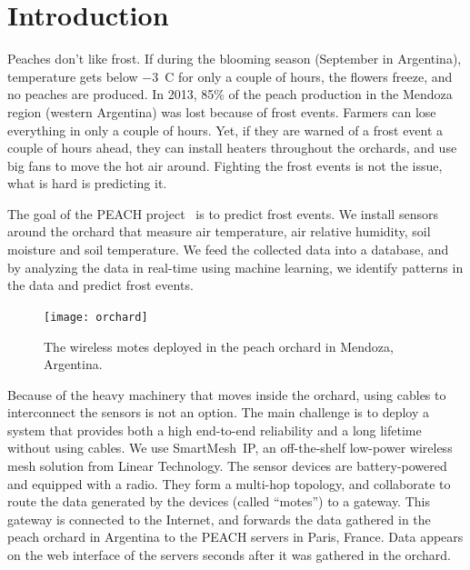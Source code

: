 \documentclass{sig-alternate}
\newcommand{\smip}                {SmartMesh~IP\xspace}
\begin{document}
\section{Introduction}
\label{sec:intro}


Peaches don't like frost.
If during the blooming season (September in Argentina), temperature gets below $-$3~C for only a couple of hours, the flowers freeze, and no peaches are produced.
In 2013, 85\% of the peach production in the Mendoza region (western Argentina) was lost because of frost events.
Farmers can lose everything in only a couple of hours.
Yet, if they are warned of a frost event a couple of hours ahead, they can install heaters throughout the orchards, and use big fans to move the hot air around.
Fighting the frost events is not the issue, what is hard is predicting it.


The goal of the PEACH project~\cite{watteyne16peach} is to predict frost events.
We install sensors around the orchard that measure air temperature, air relative humidity, soil moisture and soil temperature.
We feed the collected data into a database, and by analyzing the data in real-time using machine learning, we identify patterns in the data and predict frost events.

\begin{figure}
    \centering
    \texttt{[image: orchard]}
    \caption{The wireless motes deployed in the peach orchard in Mendoza, Argentina.}
    \label{fig:orchard}
\end{figure}


Because of the heavy machinery that moves inside the orchard, using cables to interconnect the sensors is not an option.
The main challenge is to deploy a system that provides both a high end-to-end reliability and a long lifetime without using cables.
We use \smip, an off-the-shelf low-power wireless mesh solution from Linear Technology.
The sensor devices are battery-powered and equipped with a radio.
They form a multi-hop topology, and collaborate to route the data generated by the devices (called ``motes'') to a gateway.
This gateway is connected to the Internet, and forwards the data gathered in the peach orchard in Argentina to the PEACH servers in Paris, France.
Data appears on the web interface of the servers seconds after it was gathered in the orchard.
\end{document}
